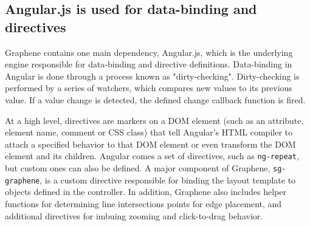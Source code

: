 \subsection{Angular.js is used for data-binding and directives}
Graphene contains one main dependency, Angular.js, which is the underlying engine responsible for data-binding and directive definitions.
Data-binding in Angular is done through a process known as "dirty-checking".
Dirty-checking is performed by a series of watchers, which compares new values to its previous value. \autocite{google2014angularScope}
If a value change is detected, the defined change callback function is fired.

At a high level, directives are markers on a DOM element (such as an attribute, element name, comment or CSS class) that tell Angular's HTML compiler to attach a specified behavior to that DOM element or even transform the DOM element and its children. \autocite{google2014angularDirectives, google2014angulardirectives2}
Angular comes a set of directives, such as \texttt{ng-repeat}, but custom ones can also be defined.
A major component of Graphene, \texttt{sg-graphene}, is a custom directive responsible for binding the layout template to objects defined in the controller.
In addition, Graphene also includes helper functions for determining line intersections points for edge placement, and additional directives for imbuing zooming and click-to-drag behavior.



